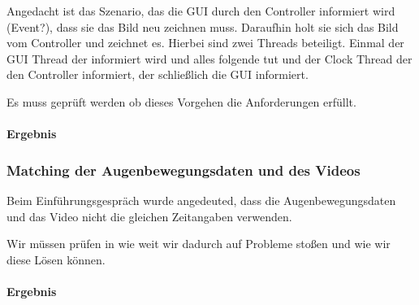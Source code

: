\documentclass[a4paper,draft]{scrartcl}
\begin{document}
Angedacht ist das Szenario, das die GUI durch den Controller informiert wird (Event?), dass sie das Bild neu zeichnen muss. Daraufhin holt sie sich das Bild vom Controller und zeichnet es. Hierbei sind zwei Threads beteiligt. Einmal der GUI Thread der informiert wird und alles folgende tut und der Clock Thread der den Controller informiert, der schließlich die GUI informiert.

Es muss geprüft werden ob dieses Vorgehen die Anforderungen erfüllt.

\paragraph*{Ergebnis}

\subsubsection*{Matching der Augenbewegungsdaten und des Videos}
Beim Einführungsgespräch wurde angedeuted, dass die Augenbewegungsdaten und das Video nicht die gleichen Zeitangaben verwenden.

Wir müssen prüfen in wie weit wir dadurch auf Probleme stoßen und wie wir diese Lösen können.

\paragraph*{Ergebnis}
\end{document}

